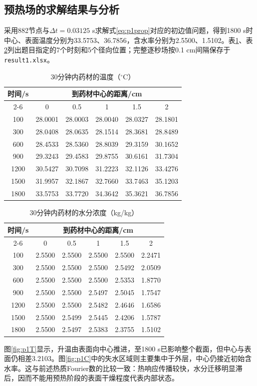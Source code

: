 \subsection{预热场的求解结果与分析}
采用882节点与$\Delta t=0.03125$ s求解式\eqref{eq:p1prop}对应的初边值问题，得到1800 s时中心、表面温度分别为33.5753、36.7856\tempunit，含水率分别为2.5500、1.5102\cunit。表\ref{tab:p1T}、表\ref{tab:p1C}列出题目指定的7个时刻和5个径向位置；完整逐秒场按0.1 cm间隔保存于\texttt{result1.xlsx}。
\begin{table}[!htbp]\centering
\caption{30分钟内药材的温度（$^{\circ}$C）}\label{tab:p1T}
\begin{tabular}{cccccc}\toprule
\multirow[c]{2}{*}{时间/s}&\multicolumn{5}{c}{到药材中心的距离/cm}\\\cmidrule(lr){2-6}
&0&0.5&1&1.5&2\\\midrule
100&28.0001&28.0003&28.0040&28.0327&28.1801\\
300&28.0408&28.0635&28.1514&28.3681&28.8489\\
600&28.4533&28.5360&28.8039&29.3159&30.1652\\
900&29.3243&29.4583&29.8755&30.6161&31.7304\\
1200&30.5427&30.7098&31.2223&32.1126&33.4276\\
1500&31.9957&32.1867&32.7660&33.7463&35.1203\\
1800&33.5753&33.7720&34.3642&35.3621&36.7856\\\bottomrule
\end{tabular}\end{table}
\begin{table}[!htbp]\centering
\caption{30分钟内药材的水分浓度（kg/kg）}\label{tab:p1C}
\begin{tabular}{cccccc}\toprule
\multirow[c]{2}{*}{时间/s}&\multicolumn{5}{c}{到药材中心的距离/cm}\\\cmidrule(lr){2-6}
&0&0.5&1&1.5&2\\\midrule
100&2.5500&2.5500&2.5500&2.5500&2.2471\\
300&2.5500&2.5500&2.5500&2.5492&2.0509\\
600&2.5500&2.5500&2.5500&2.5353&1.8770\\
900&2.5500&2.5500&2.5497&2.5045&1.7547\\
1200&2.5500&2.5500&2.5482&2.4646&1.6586\\
1500&2.5500&2.5499&2.5445&2.4206&1.5787\\
1800&2.5500&2.5497&2.5383&2.3755&1.5102\\\bottomrule
\end{tabular}\end{table}
图\ref{fig:p1T}显示，升温由表面向中心推进，至1800 s已影响整个截面，但中心与表面仍相差3.2103\tempunit。图\ref{fig:p1C}中的失水区域则主要集中于外层，中心仍接近初始含水率。这与前述热质Fourier数的比较一致：热响应传播较快，水分迁移明显滞后，因而不能用预热阶段的表面干燥程度代表内部状态。
\FloatBarrier

